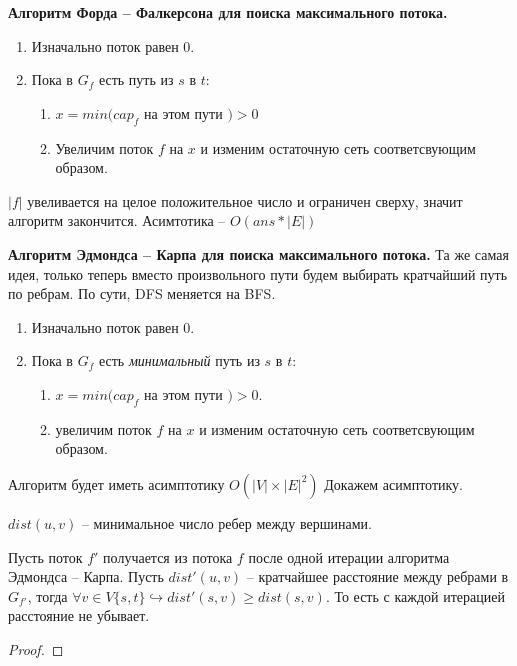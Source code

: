 \textbf{Алгоритм Форда -- Фалкерсона для поиска максимального потока.}
\begin{enumerate}
	\item Изначально поток равен 0.
	\item Пока в $G_f$ есть путь из  $s$ в  $t$:\\
		\begin{enumerate}
			\item $x = min(cap_f$ на этом пути  $) > 0$ 
			\item Увеличим поток $f$ на $x$ и изменим остаточную сеть соответсвующим образом.
		\end{enumerate}
\end{enumerate}
$\lvert f \rvert$ увеливается на целое положительное число и ограничен сверху, значит алгоритм закончится.
Асимтотика -- $O(ans * \lvert E  \rvert)$ 

\textbf{Алгоритм Эдмондса -- Карпа для поиска максимального потока.}
Та же самая идея, только теперь вместо произвольного пути будем выбирать кратчайший путь по ребрам. По сути, DFS меняется на BFS.
\begin{enumerate}
	\item Изначально поток равен 0.
	\item Пока в $G_f$ есть \textit{минимальный} путь из $s $ в $t$:
		\begin{enumerate}
			\item $x = min(cap_f$ на этом пути $) > 0$.
			\item  увеличим поток $f$ на  $x$  и изменим остаточную сеть соответсвующим образом.
		\end{enumerate}
\end{enumerate}

Алгоритм будет иметь асимптотику $O(\lvert V \rvert \times \lvert E \rvert ^ 2)$
Докажем асимптотику.

\begin{Def}
	$dist(u, v)$ -- минимальное число ребер между вершинами.
\end{Def}

\begin{lemma}
	Пусть поток $f'$ получается из потока $f$ после одной итерации алгоритма Эдмондса -- Карпа.
	Пусть $dist'(u, v)$ -- кратчайшее расстояние между ребрами в $G_{f'}$, тогда
	$\forall v \in V \{s, t\} \hookrightarrow dist'(s, v) \geq dist(s, v)$. 
	То есть с каждой итерацией расстояние не убывает.
\end{lemma}

\begin{proof}
	
\end{proof}
